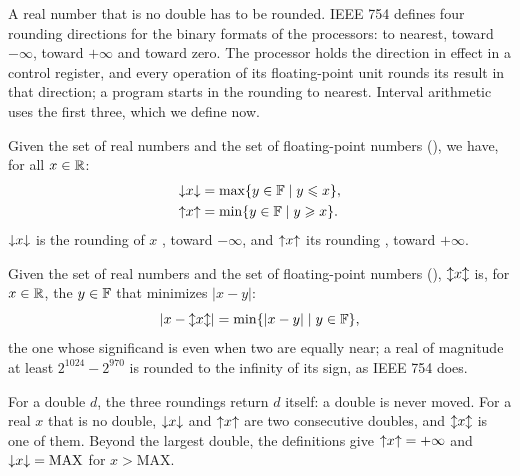 \medskip
A real number that is no double has to be rounded. IEEE 754 defines four
rounding directions for the binary formats of the processors: to nearest, toward $-\infty$, toward $+\infty$ and
toward zero. The processor holds the direction in effect in a control
register, and every operation of its floating-point unit rounds its result
in that direction; a program starts in the rounding to nearest. Interval
arithmetic uses the first three, which we define now.
%

\begin{Def}\label{def:round-down-up}
%
%
%
%
%
Given \RSet{} the set of real numbers and \FSet{} the set of floating-point
numbers (), we have, for all $x\in\mathbb{R}$:
\begin{align*}
  \mathopen{\downarrow}x\mathclose{\downarrow} &= \max\{y\in\mathbb{F}\mid y\leqslant x\},\\
  \mathopen{\uparrow}x\mathclose{\uparrow} &= \min\{y\in\mathbb{F}\mid y\geqslant x\}.
\end{align*}
$\mathopen{\downarrow}x\mathclose{\downarrow}$ is the rounding of $x$ , toward $-\infty$, and
$\mathopen{\uparrow}x\mathclose{\uparrow}$ its rounding , toward $+\infty$.
\end{Def}

\begin{Def}\label{def:round-nearest}
%
Given \RSet{} the set of real numbers and \FSet{} the set of floating-point
numbers (), $\mathopen{\updownarrow}x\mathclose{\updownarrow}$ is, for $x\in\mathbb{R}$, the
$y\in\mathbb{F}$ that minimizes $|x-y|$:
\begin{equation*}
  |x-\mathopen{\updownarrow}x\mathclose{\updownarrow}| = \min\{|x-y|\mid y\in\mathbb{F}\},
\end{equation*}
the one whose significand is even when two are equally near; a real of magnitude
at least $2^{1024}-2^{970}$ is rounded to the infinity of its sign, as IEEE 754
does.
\end{Def}

For a double $d$, the three roundings return $d$ itself: a double is never
moved. For a real $x$ that is no double, $\mathopen{\downarrow}x\mathclose{\downarrow}$ and $\mathopen{\uparrow}x\mathclose{\uparrow}$
are two consecutive doubles, and $\mathopen{\updownarrow}x\mathclose{\updownarrow}$ is one of them. Beyond
the largest double, the definitions give $\mathopen{\uparrow}x\mathclose{\uparrow}=+\infty$ and
$\mathopen{\downarrow}x\mathclose{\downarrow}=\mathrm{MAX}$ for $x>\mathrm{MAX}$.

